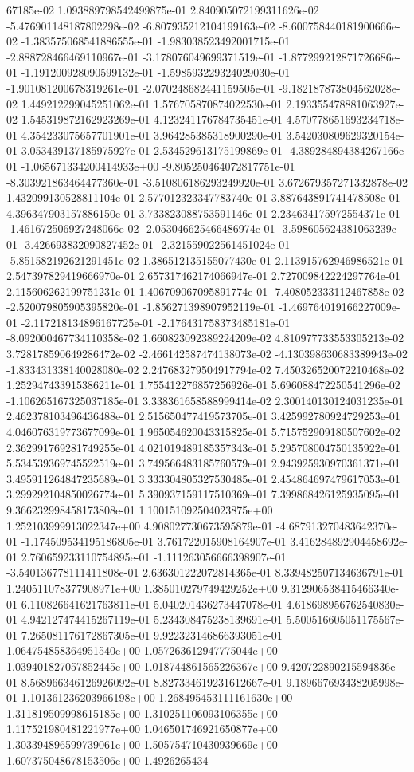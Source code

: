 67185e-02	1.093889798542499875e-01	2.840905072199311626e-02	-5.476901148187802298e-02	-6.807935212104199163e-02	-8.600758440181900666e-02	-1.383575068541886555e-01	-1.983038523492001715e-01	-2.888728466469110967e-01	-3.178076049699371519e-01	-1.877299212871726686e-01	-1.191200928090599132e-01	-1.598593229324029030e-01	-1.901081200678319261e-01	-2.070248682441159505e-01	-9.182187873804562028e-02	1.449212299045251062e-01	1.576705870874022530e-01	2.193355478881063927e-02	1.545319872162923269e-01	4.123241176784735451e-01	4.570778651693234718e-01	4.354233075657701901e-01	3.964285385318900290e-01	3.542030809629320154e-01	3.053439137185975927e-01	2.534529613175199869e-01	-4.389284894384267166e-01	-1.065671334200414933e+00	-9.805250464072817751e-01	-8.303921863464477360e-01	-3.510806186293249920e-01	3.672679357271332878e-02	1.432099130528811104e-01	2.577012323347783740e-01	3.887643891741478508e-01	4.396347903157886150e-01	3.733823088753591146e-01	2.234634175972554371e-01	-1.461672506927248066e-02	-2.053046625466486974e-01	-3.598605624381063239e-01	-3.426693832090827452e-01	-2.321559022561451024e-01	-5.851582192621291451e-02	1.386512135155077430e-01	2.113915762946986521e-01	2.547397829419666970e-01	2.657317462174066947e-01	2.727009842224297764e-01	2.115606262199751231e-01	1.406709067095891774e-01	-7.408052333112467858e-02	-2.520079805905395820e-01	-1.856271398907952119e-01	-1.469764019166227009e-01	-2.117218134896167725e-01	-2.176431758373485181e-01	-8.092000467734110358e-02	1.660823092389224209e-02	4.810977733553305213e-02	3.728178590649286472e-02	-2.466142587474138073e-02	-4.130398630683389943e-02	-1.833431338140028080e-02	2.247683279504917794e-02	7.450326520072210468e-02	1.252947433915386211e-01	1.755412276857256926e-01	5.696088472250541296e-02	-1.106265167325037185e-01	3.338361658588999414e-02	2.300140130124031235e-01	2.462378103496436488e-01	2.515650477419573705e-01	3.425992780924729253e-01	4.046076319773677099e-01	1.965054620043315825e-01	5.715752909180507602e-02	2.362991769281749255e-01	4.021019489185357343e-01	5.295708004750135922e-01	5.534539369745522519e-01	3.749566483185760579e-01	2.943925930970361371e-01	3.495911264847235689e-01	3.333304805327530485e-01	2.454864697479617053e-01	3.299292104850026774e-01	5.390937159117510369e-01	7.399868426125935095e-01	9.366232998458173808e-01	1.100151092504023875e+00	1.252103999913022347e+00	4.908027730673595879e-01	-4.687913270483642370e-01	-1.174509534195186805e-01	3.761722015908164907e-01	3.416284892904458692e-01	2.760659233110754895e-01	-1.111263056666398907e-01	-3.540136778111411808e-01	2.636301222072814365e-01	8.339482507134636791e-01	1.240511078377908971e+00	1.385010279749429252e+00	9.312906538415466340e-01	6.110826641621763811e-01	5.040201436273447078e-01	4.618698956762540830e-01	4.942127474415267119e-01	5.234308475238139691e-01	5.500516605051175567e-01	7.265081176172867305e-01	9.922323146866393051e-01	1.064754858364951540e+00	1.057263612947775044e+00	1.039401827057852445e+00	1.018744861565226367e+00	9.420722890215594836e-01	8.568966346126926092e-01	8.827334619231612667e-01	9.189667693438205998e-01	1.101361236203966198e+00	1.268495453111161630e+00	1.311819509998615185e+00	1.310251106093106355e+00	1.117521980481221977e+00	1.046501746921650877e+00	1.303394896599739061e+00	1.505754710430939669e+00	1.607375048678153506e+00	1.4926265434
